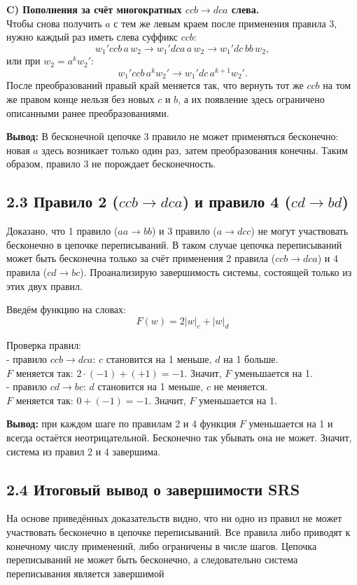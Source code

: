 \documentclass[12pt,a4paper]{article}
\begin{document}
\textbf{C) Пополнения за счёт многократных \(ccb \to dca\) слева.}\\
Чтобы снова получить \(a\) с тем же левым краем после применения правила 3, нужно каждый раз иметь слева суффикс \(ccb\):
\[
w_1' ccb\, a\, w_2 \to w_1' dca\, a\, w_2 \to w_1' dc\, bb\, w_2,
\]
или при \(w_2=a^{k}w_2'\):
\[
w_1' ccb\, a^{k} w_2' \to w_1' dc\, a^{k+1} w_2'.
\]
После преобразований правый край меняется так, что вернуть тот же \(ccb\) на том же правом конце нельзя без новых \(c\) и \(b\), а их появление здесь ограничено описанными ранее преобразованиями.

\textbf{Вывод:}
В бесконечной цепочке 3 правило не может применяться бесконечно: новая \(a\) здесь возникает только один раз, затем преобразования конечны. Таким образом, правило 3 не порождает бесконечность. 

\subsection*{2.3 Правило 2 (\(ccb \to dca\)) и правило 4 (\(cd\to bd\))}
Доказано, что 1 правило (\(aa \to bb\)) и 3 правило (\(a \to dcc\)) не могут участвовать бесконечно в цепочке переписываний. В таком случае цепочка переписываний может быть бесконечна только за счёт применения 2 правила (\(ccb \to dca\)) и 4 правила (\(cd \to bc\)). Проанализирую завершимость системы, состоящей только из этих двух правил.

Введём функцию на словах:
\[
F(w) = 2|w|_c + |w|_d
\]

Проверка правил:\\
- правило \(ccb \to dca\):  
  \(c\) становится на 1 меньше, \(d\) на 1 больше.  \\
  \(F\) меняется так: \(2\cdot(-1)+(+1)=-1\). Значит, \(F\) уменьшается на 1.\\
- правило \(cd \to bc\):  
  \(d\) становится на 1 меньше, \(c\) не меняется.  \\
  \(F\) меняется так: \(0+(-1)=-1\). Значит, \(F\) уменьшается на 1.

\textbf{Вывод:} при каждом шаге по правилам 2 и 4 функция \(F\) уменьшается на 1 и всегда остаётся неотрицательной. Бесконечно так убывать она не может. Значит, система из правил 2 и 4 завершима.

\subsection*{2.4 Итоговый вывод о завершимости SRS}
На основе приведённых доказательств видно, что ни одно из правил не может участвовать бесконечно в цепочке переписываний. Все правила либо приводят к конечному числу применений, либо ограничены в числе шагов. Цепочка переписываний не может быть бесконечно, а следовательно система переписывания является завершимой
\end{document}
